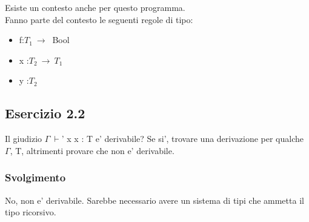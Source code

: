 	Esiste un contesto anche per questo programma. \\
	Fanno parte del contesto le seguenti regole di tipo:
\begin{itemize}
	\item f:$T_1\:\rightarrow\:$ Bool
	\item x :$T_2\:\rightarrow\:T_1$
	\item y :$T_2$
\end{itemize}


\subsection*{Esercizio 2.2}
Il giudizio $\Gamma\:\vdash$' x x : T e' derivabile? Se si', trovare una derivazione per qualche $\Gamma$, T, altrimenti provare che non e' derivabile.

\subsubsection*{Svolgimento}
 	\begin{prooftree} 
	\end{prooftree} 

No, non e' derivabile. Sarebbe necessario avere un sistema di tipi che ammetta il tipo ricorsivo. \\


